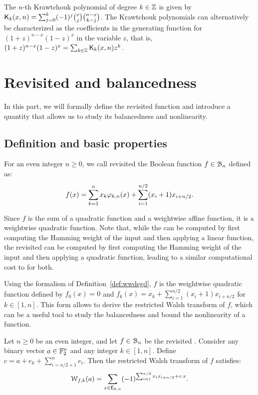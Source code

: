 \documentclass{llncs}
\begin{document}
\begin{definition}\label{def:Kraw}
	The $n$-th Krawtchouk polynomial of degree $k\in\mathbb{Z}$ is given by $\mathsf{K}_{k}(x,n)=\sum_{j=0}^{k} (-1)^j \binom{x}{j} \binom{n-x}{k-j}$. The Krawtchouk polynomials can alternatively be characterized as the coefficients in the generating function for $(1+z)^{n-x} (1-z)^x$ in the variable $z$, that is, $(1+z)^{n-x} (1-z)^x=\sum_{k\in\mathbb{Z}} \mathsf{K}_{k}(x,n) z^k$.
\end{definition} 

\section{Revisited \hwbf{} and balancedness}\label{sec:defAndBal}

In this part, we will formally define the revisited \hwbf{} function and introduce a quantity that allows us to study its balancedness and nonlinearity.

\subsection{Definition and basic properties}

\begin{definition}\label{def:revHWBF}
	For an even integer $n\geq 0$, we call revisited \hwbf{} the Boolean function $f\in\mathcal{B}_n$ defined as:
	\[
		f(x)=\sum_{k=1}^nx_k\varphi_{k,n}(x)+\sum_{i=1}^{n/2}(x_i+1) x_{i+n/2}.
	\]
\end{definition}

Since $f$ is the sum of a quadratic function and a weightwise affine function, it is a weightwise quadratic function. Note that, while the \hwbf{} can be computed by first computing the Hamming weight of the input and then applying a linear function, the revisited \hwbf{} can be computed by first computing the Hamming weight of the input and then applying a quadratic function, leading to a similar computational cost to for both.

Using the formalism of Definition~\ref{def:wwdegd}, $f$ is the weightwise quadratic function defined by $f_0(x)=0$ and $f_k(x)=x_k+\sum_{i=1}^{n/2}(x_i+1) x_{i+n/2}$ for $k\in[1,n]$. This form allows to derive the restricted Walsh transform of $f$, which can be a useful tool to study the balancedness and bound the nonlinearity of a function.

\begin{proposition}\label{prop:restrWT}
	Let $n\geq 0$ be an even integer, and let $f\in\mathcal{B}_n$ be the revisited \hwbf{}. Consider any binary vector $a\in\mathbb{F}_2^n$ and any integer $k\in[1,n]$. Define $c=a+e_k+\sum_{i=n/2+1}^n e_i$. Then the restricted Walsh transform of $f$ satisfies:
	\[
		\mathcal{W}_{f,k}(a)=\sum_{x \in \mathsf{E}_{k,n}} (-1)^{\sum_{i=1}^{n/2} x_i x_{i+n/2}+ c \cdot x}.
	\]
\end{proposition}
\end{document}
